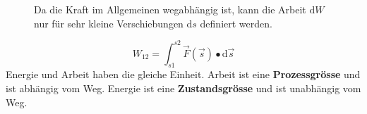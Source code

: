 \begin{figure}[H]
\centering
\caption{Da die Kraft im Allgemeinen wegabhängig ist, kann die Arbeit $\text{d}W$ nur für sehr kleine Verschiebungen d$s$ definiert werden.}
\label{fig_Ib}
\end{figure}   
\begin{equation}
\boxed{W_{12}=\displaystyle\int_{s1}^{s2}\overrightarrow{F}\left(\overrightarrow{s}\right)\bullet \text{d}\overrightarrow{s}}
\end{equation}
Energie und Arbeit haben die gleiche Einheit. Arbeit ist eine \textbf{Prozessgrösse} und ist abhängig vom Weg. Energie ist eine \textbf{Zustandsgrösse} und ist unabhängig vom Weg.
